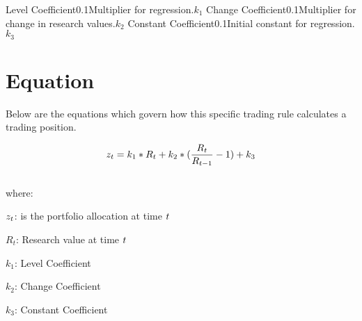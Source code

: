 \documentclass{article}
\begin{document}
\logo
{} %
\tblofcontents



{Level Coefficient}{0.1}{Multiplier for regression.}{$k_1$}
{Change Coefficient}{0.1}{Multiplier for change in research values.}{$k_2$}
{Constant Coefficient}{0.1}{Initial constant for regression.}{$k_3$}
\stoptable %

\section{Equation}
Below are the equations which govern how this specific trading rule calculates a trading position.

\begin{equation}
z_t = k_1*R_t +k_2*(\frac{R_t}{R_{t-1}}-1)+k_3
\end{equation}
\\ %
where:

$z_t$: is the portfolio allocation at time $t$

$R_t$: Research value at time $t$

$k_1$: Level Coefficient

$k_2$: Change Coefficient

$k_3$: Constant Coefficient

\keyterms
\furtherlinks %
\end{document}
